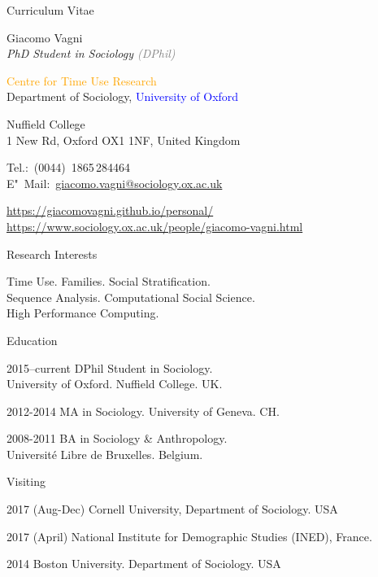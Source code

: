 \documentclass[12pt,a4paper]{article}
\begin{document}
\begin{cv}{Curriculum Vitae}
  \begin{cvlist}{}
  \item \colorbox{mygray} {Giacomo Vagni}\\
  \emph{PhD Student in Sociology \textcolor{Gray}{(DPhil)}}
  
    \textcolor{Orange} {Centre for Time Use Research} \\
     Department of Sociology, \textcolor{Blue}{University of Oxford} 
    \item Nuffield College \\ 
    1 New Rd, Oxford OX1 1NF, United Kingdom
  \item Tel.:~(0044)~1865\,284464\\
    E"~Mail:~\href{mailto:giacomo.vagni@sociology.ox.ac.uk}{giacomo.vagni@sociology.ox.ac.uk}
    
    \item \href{https://giacomovagni.github.io/personal/} {https://giacomovagni.github.io/personal/} \\ 
     \href{https://www.sociology.ox.ac.uk/people/giacomo-vagni.html} {https://www.sociology.ox.ac.uk/people/giacomo-vagni.html} \\
    
  \end{cvlist}
  
  \begin{cvlist}{Research Interests}
  \item[] Time Use. Families. Social Stratification. \\  Sequence Analysis. Computational Social Science. \\ High Performance Computing. 
  \end{cvlist}
  
  \begin{cvlist}{Education}
  \item[2015--current] DPhil Student in Sociology. \\ University of Oxford. Nuffield College. UK. 
  \item[2012-2014] MA in Sociology. University of Geneva. CH. 
  \item[2008-2011] BA in Sociology \& Anthropology. \\ Universit{\'e} Libre de Bruxelles. Belgium. 
  \end{cvlist}
  
      \begin{cvlist}{Visiting}
      	\item[2017 (Aug-Dec)] Cornell University, Department of Sociology. USA 
      	\item[2017 (April)] National Institute for Demographic Studies (INED), France. 
      	\item[2014] Boston University. Department of Sociology. USA
      \end{cvlist}
      

\end{cv}
\end{document}
